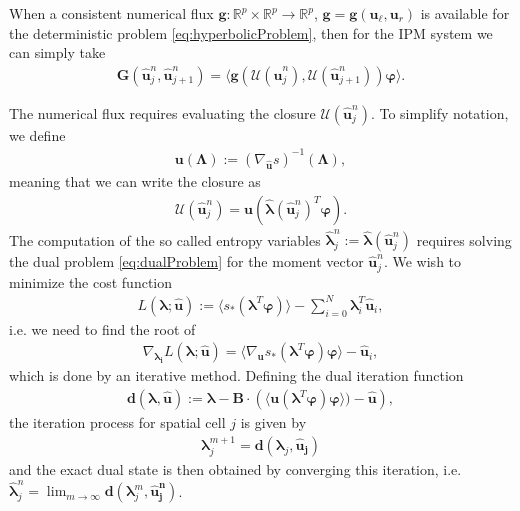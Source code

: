 When a consistent numerical flux $\bm g:\mathbb{R}^p\times\mathbb{R}^p\to\mathbb{R}^p$, $\bm g = \bm g(\bm u_\ell, \bm u_r)$ is available for the deterministic problem \eqref{eq:hyperbolicProblem}, then for the IPM system we can simply take
\begin{align*}
 \bm{G}(\bm{\hat u}_{j}^n,\bm{\hat u}_{j+1}^{n}) = \langle \bm g(\mathcal{U}(\bm{\hat u}_j^n),\mathcal{U}(\bm{\hat u}_{j+1}^n))\bm{\varphi}\rangle.
\end{align*}

The numerical flux requires evaluating the closure $\mathcal{U}(\bm{\hat u}_j^n)$. To simplify notation, we define
\begin{align*}
\bm{u}(\bm\Lambda):=\left( \nabla_{\bm{\hat u}} s \right)^{-1}(\bm\Lambda),
\end{align*}
meaning that we can write the closure as
\begin{align*}
\mathcal{U}(\bm{\hat u}_j^n) = \bm{u}(\bm{\hat{\lambda}}(\bm{\hat u}_j^n)^T \bm{\varphi}).
\end{align*}
The computation of the so called entropy variables $\bm{\hat\lambda}_j^n:=\bm{\hat\lambda}(\bm{\hat u}_j^n)$ requires solving the dual problem \eqref{eq:dualProblem} for the moment vector $\bm{\hat u}_{j}^{n}$. We wish to minimize the cost function
\begin{align*}
L(\bm{\lambda};\bm{\hat{u}}) := \langle s_*(\bm{\lambda}^T \bm\varphi)\rangle - \sum_{i=0}^{N}\bm{\lambda}_i^T \bm{\hat u}_i,
\end{align*}
i.e. we need to find the root of
\begin{align*}
\nabla_{\bm{\lambda_i}}L(\bm{\lambda};\bm{\hat{u}}) = \langle \nabla_{\bm{u}}s_*(\bm{\lambda}^T \bm\varphi)\bm\varphi\rangle - \bm{\hat u}_i,
\end{align*}
which is done by an iterative method. Defining the dual iteration function
\begin{align*}
\bm{d}(\bm{\lambda},\bm{\hat{u}}):= \bm{\lambda}-\bm{B}\cdot \left(\langle \bm u(\bm{\lambda}^T\bm{\varphi})\bm{\varphi}\rangle)-\bm{\hat{u}}\right),
\end{align*}
the iteration process for spatial cell $j$ is given by
\begin{align}\label{eq:dualIteration1}
\bm{\lambda}^{m+1}_j = \bm{d}(\bm{\lambda}_j,\bm{\hat{u}_j})
\end{align}
and the exact dual state is then obtained by converging this iteration, i.e. $\bm{\hat\lambda}_j^n=\lim_{m\rightarrow\infty}\bm{d}(\bm{\lambda}_j^m,\bm{\hat{u}_j^n})$.


